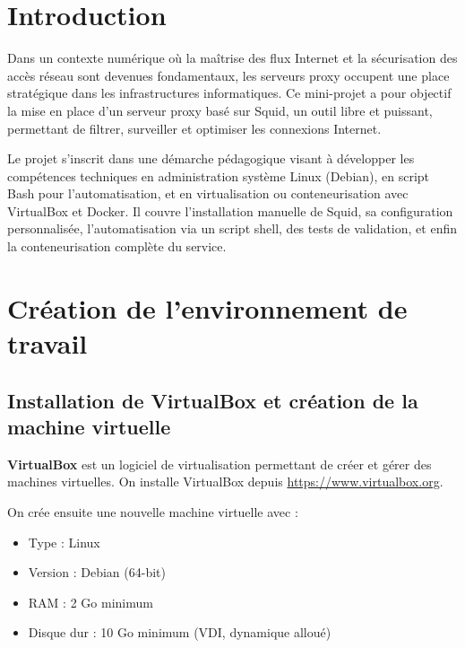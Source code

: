 \documentclass[12pt,a4paper]{article}
\begin{document}
\vspace{1cm}

\vspace{1cm} %



\newpage
\tableofcontents
\clearpage
{}
\newpage
\section*{Introduction}
Dans un contexte numérique où la maîtrise des flux Internet et la sécurisation des accès réseau sont devenues fondamentaux, les serveurs proxy occupent une place stratégique dans les infrastructures informatiques. Ce mini-projet a pour objectif la mise en place d’un serveur proxy basé sur Squid, un outil libre et puissant, permettant de filtrer, surveiller et optimiser les connexions Internet.

Le projet s’inscrit dans une démarche pédagogique visant à développer les compétences techniques en administration système Linux (Debian), en script Bash pour l’automatisation, et en virtualisation ou conteneurisation avec VirtualBox et Docker. Il couvre l’installation manuelle de Squid, sa configuration personnalisée, l’automatisation via un script shell, des tests de validation, et enfin la conteneurisation complète du service.


\section{Création de l’environnement de travail}
\subsection{Installation de VirtualBox et création de la machine virtuelle}
\textbf{VirtualBox} est un logiciel de virtualisation permettant de créer et gérer des machines virtuelles. On installe VirtualBox depuis \url{https://www.virtualbox.org}.

On crée ensuite une nouvelle machine virtuelle avec :
\begin{itemize}
    \item Type : Linux
\end{itemize}
\begin{itemize}
    \item Version : Debian (64-bit)
\end{itemize}
\begin{itemize}
    \item RAM : 2 Go minimum
\end{itemize}
\begin{itemize}
    \item Disque dur : 10 Go minimum (VDI, dynamique alloué)
\end{itemize}
\end{document}
